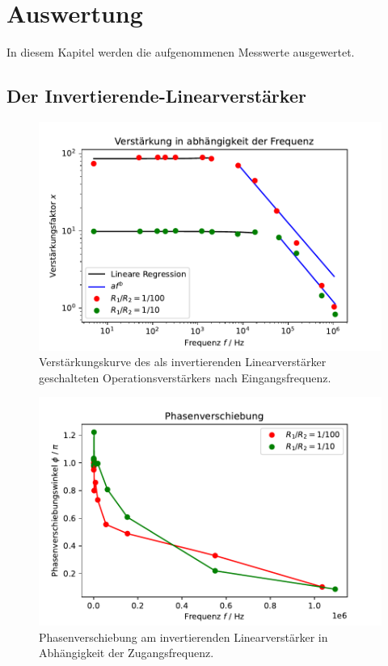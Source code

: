 


\section{Auswertung}
\label{sec:auswertung}

In diesem Kapitel werden die aufgenommenen Messwerte ausgewertet.
\subsection{Der Invertierende-Linearverstärker}
\label{sec:linearverstaerker}
\begin{figure}
    \centering
    \includegraphics{content/grafiken/verstaerkung.pdf}
    \caption{Verstärkungskurve des als invertierenden Linearverstärker geschalteten Operationsverstärkers nach Eingangsfrequenz.}
    \label{fig:linearverstaerker}
  \end{figure}

  \begin{figure}
    \centering
    \includegraphics{content/grafiken/phasenverschiebung.pdf}
    \caption{Phasenverschiebung am invertierenden Linearverstärker in Abhängigkeit der Zugangsfrequenz.}
    \label{fig:phasenverschiebung}
  \end{figure}




